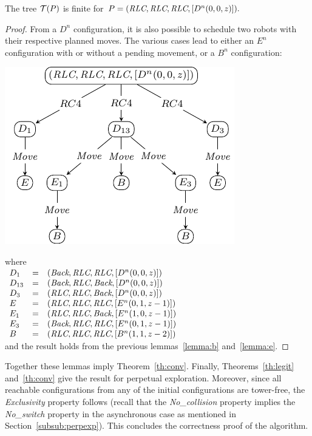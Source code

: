 \begin{lemma}
\label{lemma:d}
The tree $\mathcal{T}(P)$ is finite for $P=(\textit{RLC}, \textit{RLC}, \textit{RLC}, [D^n(0, 0, z)]).$
\end{lemma}

\begin{proof}
  From a $D^n$ configuration, it is also possible to schedule two
  robots with their respective planned moves. The various cases lead
  to either an $E^n$ configuration with or without a pending
  movement, or a $B^n$ configuration:\\
\begin{center}
\includegraphics[scale=1]{figures/figD}%
\end{center}
	where\\
$\begin{array}{l c l}
D_1 & = &(\textit{Back}, \textit{RLC}, \textit{RLC}, [D^n(0, 0, z)])\\
D_{13} & = &(\textit{Back}, \textit{RLC}, \textit{Back}, [D^n(0, 0, z)])\\
D_3 & = &(\textit{RLC}, \textit{RLC}, \textit{Back}, [D^n(0, 0, z)])\\
E & = &(\textit{RLC}, \textit{RLC}, \textit{RLC}, [E^n(0, 1, z-1)])\\
E_1 & = &(\textit{RLC}, \textit{RLC}, \textit{Back}, [E^n(1, 0, z-1)])\\
E_3 & = &(\textit{Back}, \textit{RLC}, \textit{RLC}, [E^n(0, 1, z-1)])\\
B & = &(\textit{RLC}, \textit{RLC}, \textit{RLC}, [B^n(1, 1, z-2)])\\
\end{array}$\\
and the result holds from the previous lemmas~\ref{lemma:b} and~\ref{lemma:e}.
\end{proof}

Together these lemmas imply Theorem~\ref{th:conv}. Finally, 
Theorems~\ref{th:legit} and~\ref{th:conv} give the result for
perpetual exploration. Moreover, since all reachable configurations
from any of the initial configurations are tower-free, the
\emph{Exclusivity} property follows (recall that the
\emph{No\_collision} property implies the \emph{No\_switch} property
in the asynchronous case as mentioned in
Section~\ref{subsub:perpexp}).  This concludes the correctness proof
of the algorithm.
	
		